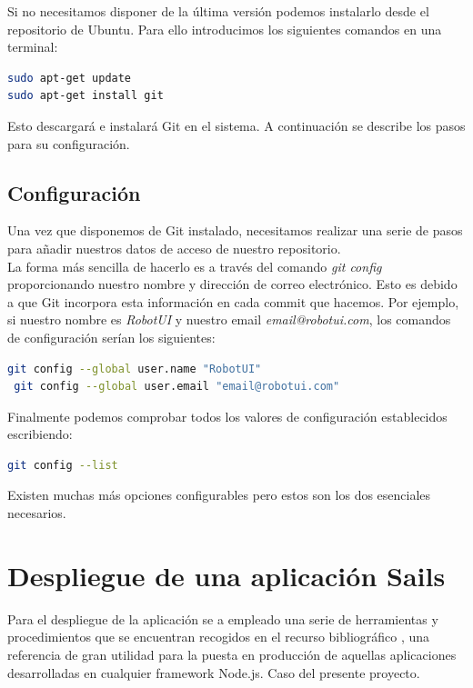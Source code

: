 \begin{appendix}
Si no necesitamos disponer de la última versión podemos instalarlo desde el repositorio de Ubuntu. Para ello introducimos los siguientes comandos en una terminal:\\

\begin{lstlisting}[language=bash]
sudo apt-get update
sudo apt-get install git
\end{lstlisting}

Esto descargará e instalará Git en el sistema. A continuación se describe los pasos para su configuración.

\subsection{Configuración}

Una vez que disponemos de Git instalado, necesitamos realizar una serie de pasos para añadir nuestros datos de acceso de nuestro repositorio.\\

La forma más sencilla de hacerlo es a través del comando \emph{git config} proporcionando nuestro nombre y dirección de correo electrónico. Esto es debido a que Git incorpora esta información en cada commit
que hacemos. Por ejemplo, si nuestro nombre es \emph{RobotUI} y nuestro email \emph{email@robotui.com}, los comandos de configuración serían los siguientes:\\

\begin{lstlisting}[language=bash]
 git config --global user.name "RobotUI"
 git config --global user.email "email@robotui.com"
\end{lstlisting}

Finalmente podemos comprobar todos los valores de configuración establecidos escribiendo:\\

\begin{lstlisting}[language=bash]
git config --list
\end{lstlisting}

Existen muchas más opciones configurables pero estos son los dos esenciales necesarios.\\

\section{Despliegue de una aplicación Sails}

Para el despliegue de la aplicación se a empleado una serie de herramientas y procedimientos que se encuentran recogidos en el recurso bibliográfico \cite{book:Deploying}, una referencia de gran 
utilidad para la puesta en producción de aquellas aplicaciones desarrolladas en cualquier framework Node.js. Caso del presente proyecto.\\


\end{appendix}
